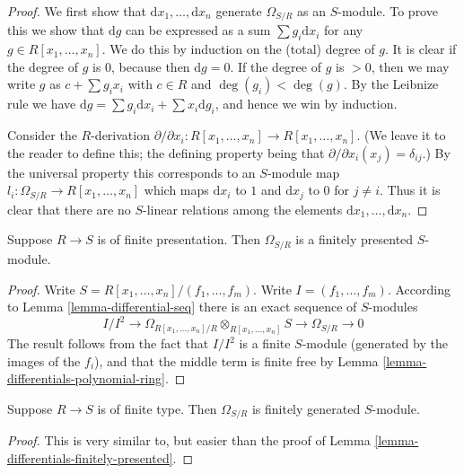 \begin{proof}
We first show that $\text{d}x_1,\ldots, \text{d}x_n$
generate $\Omega_{S/R}$ as an $S$-module. To prove this
we show that $\text{d}g$ can be expressed as a 
sum $\sum g_i \text{d}x_i$ for any $g \in R[x_1,\ldots,x_n]$.
We do this by induction on the (total) degree of $g$.
It is clear if the degree of $g$ is $0$, because then
$\text{d}g = 0$. If the degree of $g$ is $>0$, then
we may write $g$ as $c + \sum g_i x_i$ with $c\in R$
and $\deg(g_i) < \deg(g)$. By the Leibnize rule we have
$\text{d}g = \sum g_i \text{d} x_i + \sum x_i \text{d}g_i$,
and hence we win by induction.

\medskip\noindent
Consider the $R$-derivation $\partial / \partial x_i :
R[x_1,\ldots,x_n] \to R[x_1,\ldots,x_n]$. (We leave it to
the reader to define this; the defining property
being that $\partial / \partial x_i (x_j) = \delta_{ij}$.)
By the universal property this corresponds to an $S$-module map $l_i : 
\Omega_{S/R} \to R[x_1,\ldots,x_n]$ which maps $\text{d}x_i$
to $1$ and $\text{d}x_j$ to $0$ for $j \not= i$. 
Thus it is clear that there are no $S$-linear relations
among the elements $\text{d}x_1,\ldots, \text{d}x_n$.
\end{proof}

\begin{lemma}
\label{lemma-differentials-finitely-presented}
Suppose $R \to S$ is of finite presentation.
Then $\Omega_{S/R}$ is a finitely presented
$S$-module.
\end{lemma}

\begin{proof}
Write $S = R[x_1,\ldots,x_n]/(f_1, \ldots, f_m)$. 
Write $I = (f_1, \ldots, f_m)$. According
to Lemma \ref{lemma-differential-seq} there is an exact sequence
of $S$-modules
$$
I/I^2
\to
\Omega_{R[x_1,\ldots,x_n]/R}\otimes_{R[x_1,\ldots,x_n]} S
\to 
\Omega_{S/R}
\to
0
$$
The result follows from the fact that $I/I^2$ is a finite 
$S$-module (generated by the images of the $f_i$), and that
the middle term is finite free by
Lemma \ref{lemma-differentials-polynomial-ring}.
\end{proof}

\begin{lemma}
\label{lemma-differentials-finitely-generated}
Suppose $R \to S$ is of finite type.
Then $\Omega_{S/R}$ is finitely generated
$S$-module.
\end{lemma}

\begin{proof}
This is very similar to, but easier than the proof
of Lemma \ref{lemma-differentials-finitely-presented}.
\end{proof}

